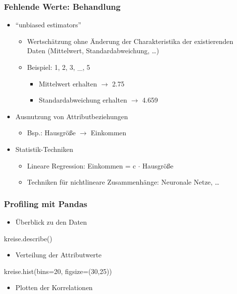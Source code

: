     
    \begin{frame}
    \frametitle{Fehlende Werte: Behandlung}
    
    \begin{itemize}
    \item "`unbiased estimators"'
    \begin{itemize}
    \item Wertschätzung ohne Änderung der Charakteristika der
      existierenden Daten (Mittelwert, Standardabweichung, \dots) 
    \item Beispiel: 1, 2, 3, \_, 5
    \begin{itemize}
    \item Mittelwert erhalten $\rightarrow$ 2.75
    \item Standardabweichung erhalten $\rightarrow$ 4.659
    \end{itemize}
    \end{itemize}
    \item Ausnutzung von Attributbeziehungen
    \begin{itemize}
    \item Bsp.: Hausgröße $\rightarrow$ Einkommen
    \end{itemize}
    \item Statistik-Techniken
    \begin{itemize}
    \item Lineare Regression: Einkommen = c $\cdot$ Hausgröße
    \item Techniken für nichtlineare Zusammenhänge: Neuronale Netze, \dots
    \end{itemize}
    \end{itemize}
    
    \end{frame}
    
    
    \begin{frame}
    \frametitle{Profiling mit Pandas}
    
    \begin{itemize}
    \item Überblick zu den Daten
    \end{itemize}
    
    \begin{python}
     kreise.describe()
    \end{python}
    
    \begin{itemize}
    \item Verteilung der Attributwerte
    \end{itemize}
    
    \begin{python}
     kreise.hist(bins=20, figsize=(30,25))
    \end{python}
    
    \begin{itemize}
    \item Plotten der Korrelationen
    \end{itemize}
    
    \end{frame}
    
